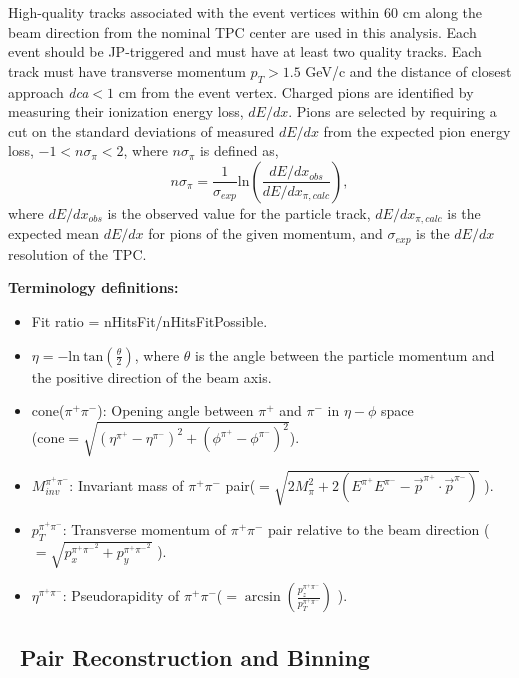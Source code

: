 High-quality tracks associated with the event vertices within 60 cm along the beam direction from the nominal TPC center are used in this analysis. Each event should be JP-triggered and must have at least two quality tracks. Each track must have transverse momentum $p_T > 1.5 $ GeV/c and the distance of closest approach \emph{dca}$< 1$ cm from the event vertex. Charged pions are identified by measuring their ionization energy loss, $dE/dx$. Pions are selected by requiring a cut on the standard deviations of measured $dE/dx$ from the expected pion energy loss,  $-1< n\sigma_{\pi}< 2$, where $n\sigma_\pi$ is defined as, 
\begin{equation}
 n\sigma_\pi = \frac{1}{\sigma_{exp}} \mathrm{ln}(\frac{dE/dx_{obs}}{dE/dx_{\pi, calc}}) ,   
\end{equation}
where $dE/dx_{obs}$ is the observed value for the particle track, $dE/dx_{\pi, calc}$ is the expected mean $dE/dx$ for pions of the given momentum, and $\sigma_{exp}$ is the $dE/dx$ resolution of the TPC. 



\textbf{Terminology definitions:}
\begin{itemize}
	\item{Fit ratio = nHitsFit/nHitsFitPossible.}
        \item $\eta = - \mathrm{ln\ tan}(\frac{\theta}{2})$, where $\theta$ is the angle between the particle momentum and the positive direction of the beam axis.  
	\item{cone($\pi^+\pi^-$): Opening angle between $\pi^+$ and $\pi^-$  in $\eta - \phi$ space\\(cone$=\sqrt{(\eta^{\pi^+}-\eta^{\pi^-})^2 +(\phi^{\pi^+}-\phi^{\pi^-})^2}$).} 
    \item{$M_{inv}^{\pi^+\pi^-}$: Invariant mass of $\pi^+\pi^-$ pair($=\sqrt{2M_{\pi}^2 +2(E^{\pi^+}E^{\pi^-}-\vec{p}^{\pi^+}\cdot \vec{p}^{\pi^-})}$ ).}
	\item{$p_{T}^{\pi^+\pi^-}$: Transverse momentum of $\pi^+\pi^-$ pair relative to the beam direction ($=\sqrt{p_x^{{\pi^+\pi^-}^2}+p_y^{{\pi^+\pi^-}^2} }$ ).}
	\item{$\eta^{\pi^+\pi^-}$: Pseudorapidity of $\pi^+\pi^-$($=\arcsin(\frac{p_z^{\pi^+\pi^-}}{p_T^{\pi^+\pi^-}})$ ).}
\end{itemize}




\subsection{\pip\ Pair Reconstruction and Binning}

